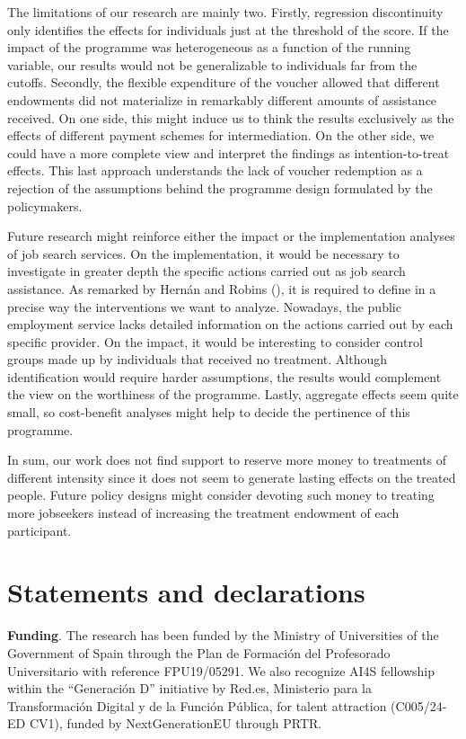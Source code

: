 \documentclass[
  11pt]{article}
\begin{document}
The limitations of our research are mainly two. Firstly, regression
discontinuity only identifies the effects for individuals just at the
threshold of the score. If the impact of the programme was heterogeneous
as a function of the running variable, our results would not be
generalizable to individuals far from the cutoffs. Secondly, the
flexible expenditure of the voucher allowed that different endowments
did not materialize in remarkably different amounts of assistance
received. On one side, this might induce us to think the results
exclusively as the effects of different payment schemes for
intermediation. On the other side, we could have a more complete view
and interpret the findings as intention-to-treat effects. This last
approach understands the lack of voucher redemption as a rejection of
the assumptions behind the programme design formulated by the
policymakers.

Future research might reinforce either the impact or the implementation
analyses of job search services. On the implementation, it would be
necessary to investigate in greater depth the specific actions carried
out as job search assistance. As remarked by Hernán and Robins
(), it is required to define in a
precise way the interventions we want to analyze. Nowadays, the public
employment service lacks detailed information on the actions carried out
by each specific provider. On the impact, it would be interesting to
consider control groups made up by individuals that received no
treatment. Although identification would require harder assumptions, the
results would complement the view on the worthiness of the programme.
Lastly, aggregate effects seem quite small, so cost-benefit analyses
might help to decide the pertinence of this programme.

In sum, our work does not find support to reserve more money to
treatments of different intensity since it does not seem to generate
lasting effects on the treated people. Future policy designs might
consider devoting such money to treating more jobseekers instead of
increasing the treatment endowment of each participant.

\section*{Statements and
declarations}\label{statements-and-declarations}

\textbf{Funding}. The research has been funded by the Ministry of
Universities of the Government of Spain through the Plan de Formación
del Profesorado Universitario with reference FPU19/05291. We also
recognize AI4S fellowship within the ``Generación D'' initiative by
Red.es, Ministerio para la Transformación Digital y de la Función
Pública, for talent attraction (C005/24-ED CV1), funded by
NextGenerationEU through PRTR.
\end{document}
